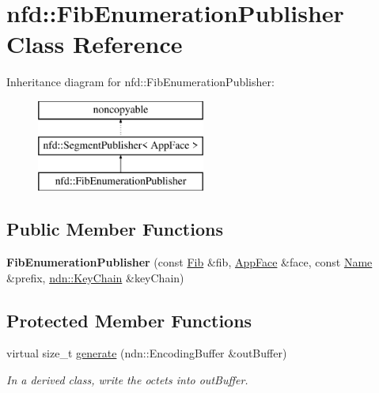 \hypertarget{classnfd_1_1FibEnumerationPublisher}{}\section{nfd\+:\+:Fib\+Enumeration\+Publisher Class Reference}
\label{classnfd_1_1FibEnumerationPublisher}
Inheritance diagram for nfd\+:\+:Fib\+Enumeration\+Publisher\+:\begin{figure}[H]
\begin{center}
\leavevmode
\includegraphics[height=3.000000cm]{classnfd_1_1FibEnumerationPublisher}
\end{center}
\end{figure}
\subsection*{Public Member Functions}
\begin{DoxyCompactItemize}
\item 
{\bfseries Fib\+Enumeration\+Publisher} (const \hyperlink{classnfd_1_1Fib}{Fib} \&fib, \hyperlink{classnfd_1_1AppFace}{App\+Face} \&face, const \hyperlink{classndn_1_1Name}{Name} \&prefix, \hyperlink{classndn_1_1security_1_1KeyChain}{ndn\+::\+Key\+Chain} \&key\+Chain)\hypertarget{classnfd_1_1FibEnumerationPublisher_a6458a704dde3128cfc6051c9a0a803ce}{}\label{classnfd_1_1FibEnumerationPublisher_a6458a704dde3128cfc6051c9a0a803ce}

\end{DoxyCompactItemize}
\subsection*{Protected Member Functions}
\begin{DoxyCompactItemize}
\item 
virtual size\+\_\+t \hyperlink{classnfd_1_1FibEnumerationPublisher_a87c8cf23bcaa9f19d98fbf9e3c641a66}{generate} (ndn\+::\+Encoding\+Buffer \&out\+Buffer)
\begin{DoxyCompactList}\small\item\em In a derived class, write the octets into out\+Buffer. \end{DoxyCompactList}\end{DoxyCompactItemize}
